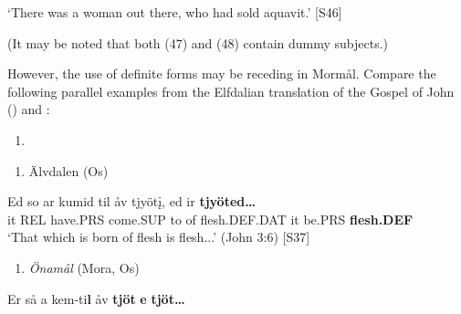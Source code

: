 ‘There was a woman out there, who had sold aquavit.’ [S46]
\z

(It may be noted that both (47) and (48) contain dummy subjects.)

However, the use of definite forms may be receding in Mormål. Compare the following parallel examples from the Elfdalian translation of the Gospel of John () and :

\begin{enumerate} %
\item 
\end{enumerate} %
\setcounter{listLFOxcviiileveli}{0}
\begin{enumerate} %
\item 
Älvdalen (Os)

\end{enumerate} %
\ea\label{}
\gll Ed  so  ar  kumid  til  åv  tjyöt\k{i},  ed  ir  \textbf{tjyöted…}\\


it  REL  have.PRS  come.SUP  to  of  flesh.DEF.DAT  it  be.PRS  \textbf{flesh.DEF}\\ %


‘That which is born of flesh is flesh...’ (John 3:6) [S37]
\z

\begin{enumerate} %
\item 
\textit{Önamål} (Mora, Os)
\end{enumerate} %
\ea\label{}
\gll Er  så  a  kem-ti\textbf{l} åv  \textbf{tjöt}\textbf{  e}\textbf{  tjöt…}\\


